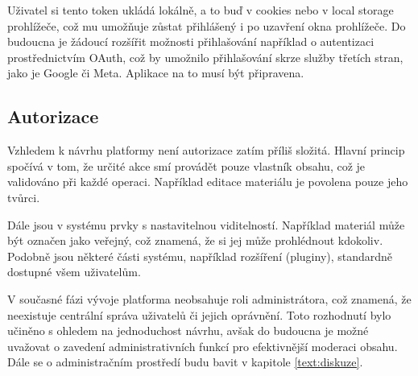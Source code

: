 Uživatel si tento token ukládá lokálně, a to buď v cookies nebo v local storage prohlížeče, což mu umožňuje zůstat přihlášený i po uzavření okna prohlížeče. 
Do budoucna je žádoucí rozšířit možnosti přihlašování například o autentizaci prostřednictvím OAuth, což by umožnilo přihlašování skrze služby třetích stran, jako je Google či Meta.
Aplikace na to musí být připravena.

\subsection{Autorizace}

Vzhledem k návrhu platformy není autorizace zatím příliš složitá. 
Hlavní princip spočívá v tom, že určité akce smí provádět pouze vlastník obsahu, což je validováno při každé operaci.
Například editace materiálu je povolena pouze jeho tvůrci. 

Dále jsou v systému prvky s nastavitelnou viditelností. 
Například materiál může být označen jako veřejný, což znamená, že si jej může prohlédnout kdokoliv. 
Podobně jsou některé části systému, například rozšíření (pluginy), standardně dostupné všem uživatelům.

V současné fázi vývoje platforma neobsahuje roli administrátora, což znamená, že neexistuje centrální správa uživatelů či jejich oprávnění. 
Toto rozhodnutí bylo učiněno s ohledem na jednoduchost návrhu, avšak do budoucna je možné uvažovat o zavedení administrativních funkcí pro efektivnější moderaci obsahu.
Dále se o administračním prostředí budu bavit v kapitole \ref{text:diskuze}.



    